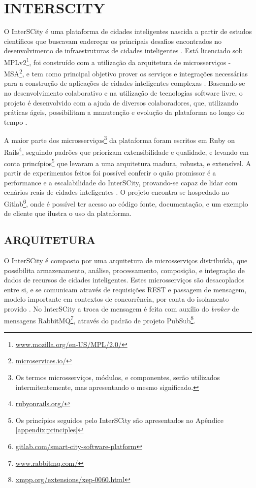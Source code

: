 \chapter[INTERSCITY]{INTERSCITY}
\label{chapter:interscity}

O InterSCity é uma plataforma de cidades inteligentes nascida a partir de
estudos científicos que buscavam endereçar os principais desafios encontrados
no desenvolvimento de infraestruturas de cidades inteligentes \cite{nof2016}.
Está licenciado sob
MPLv2\footnote{\url{www.mozilla.org/en-US/MPL/2.0/}}, foi construído com a
utilização da arquitetura de microsserviços -
MSA\footnote{\url{microservices.io/}}, e tem como principal objetivo prover os
serviços e integrações necessárias para a construção de aplicações de cidades
inteligentes complexas \cite{delesposte2017}. Baseando-se no desenvolvimento
colaborativo e na utilização de tecnologias software livre, o projeto é
desenvolvido com a ajuda de diversos colaboradores, que, utilizando práticas
ágeis, possibilitam a manutenção e evolução da plataforma ao longo do tempo
\cite{delesposte2017}.

A maior parte dos microsserviços\footnote{Os termos microsserviços, módulos, e
componentes, serão utilizados intermitentemente, mas apresentando o mesmo
significado.} da plataforma foram escritos em Ruby on Rails\footnote{\url{rubyonrails.org/}},
seguindo padrões que priorizam extensibilidade e qualidade, e levando em conta
princípios\footnote{Os princípios seguidos pelo InterSCity são apresentados no
Apêndice \ref{appendix:principles}} que levaram a uma arquitetura madura,
robusta, e extensível. A partir de experimentos feitos foi possível conferir
o quão promissor é a performance e a escalabilidade do InterSCity, provando-se
capaz de lidar com cenários reais de cidades inteligentes \cite{delesposte2017}.
O projeto encontra-se hospedado no
Gitlab\footnote{\url{gitlab.com/smart-city-software-platform}},
onde é possível ter acesso ao código fonte, documentação, e um exemplo de
cliente que ilustra o uso da plataforma.

\section{ARQUITETURA}
\label{sec:architecture}

O InterSCity é composto por uma arquitetura de microsserviços distribuída,
que possibilita armazenamento, análise, processamento, composição, e
integração de dados de recursos de cidades inteligentes. Estes microsserviços
são desacoplados entre si, e se comunicam através de requisições REST e
passagem de mensagem, modelo importante em contextos de concorrência, por conta
do isolamento provido \cite{armstrong2003}. No InterSCity a troca de mensagem
é feita com auxílio do \textit{broker} de mensagens
RabbitMQ\footnote{\url{www.rabbitmq.com/}}, através do padrão de projeto
PubSub\footnote{\url{xmpp.org/extensions/xep-0060.html}}.

